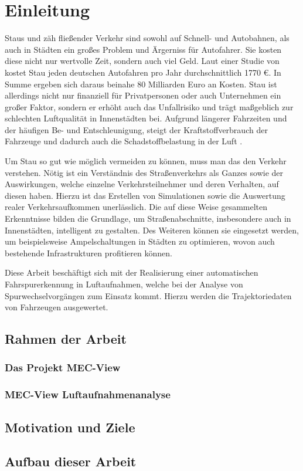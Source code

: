 
\chapter{Einleitung}
\label{cha:introduction}

Staus und zäh fließender Verkehr sind sowohl auf Schnell- und Autobahnen, als auch in Städten ein großes
Problem und Ärgerniss für Autofahrer. Sie kosten diese nicht nur wertvolle Zeit, sondern auch viel Geld.
Laut einer Studie von \cite{Cookson} kostet Stau jeden deutschen Autofahren pro Jahr durchschnittlich 1770 €.
In Summe ergeben sich daraus beinahe 80 Milliarden Euro an Kosten.
Stau ist allerdings nicht nur finanziell für Privatpersonen oder auch Unternehmen ein großer Faktor,
sondern er erhöht auch das Unfallrisiko und trägt maßgeblich zur schlechten Luftqualität in Innenstädten bei.
Aufgrund längerer Fahrzeiten und der häufigen Be- und Entschleunigung, steigt der Kraftstoffverbrauch der
Fahrzeuge und dadurch auch die Schadstoffbelastung in der Luft \cite{Hemmerle2016}.

Um Stau so gut wie möglich vermeiden zu können, muss man das den Verkehr verstehen. Nötig
ist ein Verständnis des Straßenverkehrs als Ganzes sowie der Auswirkungen, welche einzelne Verkehrsteilnehmer
und deren Verhalten, auf diesen haben. Hierzu ist das Erstellen von Simulationen sowie die Auswertung
realer Verkehrsaufkommen unerlässlich.
Die auf diese Weise gesammelten Erkenntnisse bilden die Grundlage, um Straßenabschnitte, insbesondere
auch in Innenstädten, intelligent zu gestalten.
Des Weiteren können sie eingesetzt werden, um beispielsweise Ampelschaltungen in Städten zu optimieren,
wovon auch bestehende Infrastrukturen profitieren können.

Diese Arbeit beschäftigt sich mit der Realisierung einer automatischen Fahrspurerkennung in Luftaufnahmen,
welche bei der Analyse von Spurwechselvorgängen zum Einsatz kommt. Hierzu werden die Trajektoriedaten von Fahrzeugen
ausgewertet.


\section{Rahmen der Arbeit}
\label{sec:rahmen_arbeit}

\subsection{Das Projekt MEC-View}
\label{sec:mec_view}

\subsection{MEC-View Luftaufnahmenanalyse}
\label{sec:mecview_sim}

\section{Motivation und Ziele}
\label{sec:motivation_goals}





\section{Aufbau dieser Arbeit}
\label{sec:aufbau}
